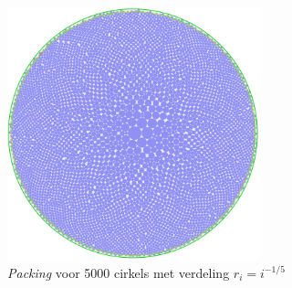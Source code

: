 \documentclass[12pt,a4paper,oneside]{book}
\begin{document}
{\begin{figure}
  \centering
  \includegraphics[width=0.65\textwidth]{packing-neg1div5-5000.png}
  \caption{\textit{Packing} voor 5000 cirkels met verdeling $r_i=i^{-1/5}$}
\end{figure}

\newpage

}
\end{document}
